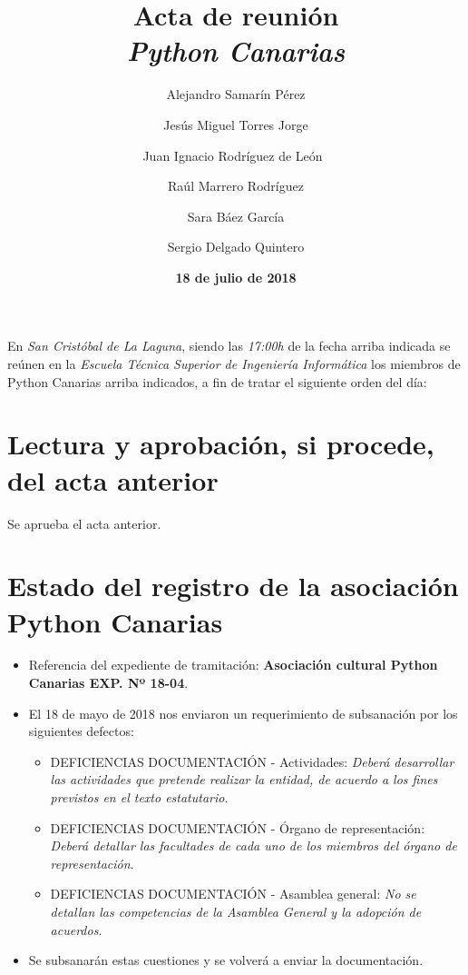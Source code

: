\documentclass[a4paper, 12pt]{article}
\title{\huge \textbf{Acta de reunión} \\ \textit{Python Canarias}}
\date{\textbf{18 de julio de 2018}}
\author{
        Alejandro Samarín Pérez \and
        Jesús Miguel Torres Jorge \and
        Juan Ignacio Rodríguez de León\ \and 
        Raúl Marrero Rodríguez \and
        Sara Báez García \and
        Sergio Delgado Quintero
    }
\begin{document}
    
    \renewcommand{\contentsname}{Orden del día}
    
    \maketitle
    
    En \textit{San Cristóbal de La Laguna}, siendo las \textit{17:00h} de la fecha arriba indicada se reúnen en la \textit{Escuela Técnica Superior de Ingeniería Informática} los miembros de Python Canarias arriba indicados, a fin de tratar el siguiente orden del día:
    
    \tableofcontents
    
    \section{Lectura y aprobación, si procede, del acta anterior}
    
    Se aprueba el acta anterior.
    
    \section{Estado del registro de la asociación Python Canarias}

    \begin{itemize}
        \item Referencia del expediente de tramitación: \textbf{Asociación cultural Python Canarias EXP. Nº 18-04}.
        \item El 18 de mayo de 2018 nos enviaron un requerimiento de subsanación por los siguientes defectos:
        \begin{itemize}
            \item DEFICIENCIAS DOCUMENTACIÓN - Actividades: \textit{Deberá desarrollar las actividades que pretende realizar la entidad, de acuerdo a los fines previstos en el texto estatutario}.
            \item DEFICIENCIAS DOCUMENTACIÓN - Órgano de representación: \textit{Deberá detallar las facultades de cada uno de los miembros del órgano de representación}.
            \item DEFICIENCIAS DOCUMENTACIÓN - Asamblea general: \textit{No se detallan las competencias de la Asamblea General y la adopción de acuerdos}.
        \end{itemize}
        \item Se subsanarán estas cuestiones y se volverá a enviar la documentación.
    \end{itemize}
\end{document}
